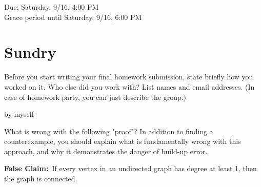 \documentclass[11pt]{article}
\begin{document}
\maketitle
\fontsize{12}{15}\selectfont

\begin{center}
    Due: Saturday, 9/16, 4:00 PM \\
    Grace period until Saturday, 9/16, 6:00 PM \\
\end{center}

\section*{Sundry}
Before you start writing your final homework submission, state briefly how you worked on it.  Who else did you work with?  List names and email addresses.  (In case of homework party, you can just describe the group.)
\begin{solution}
    by myself
\end{solution}

\vspace{15pt}


What is wrong with the following "proof"? In addition to finding a counterexample, you should explain what is fundamentally wrong with this approach, and why it demonstrates the danger of build-up error.

\textbf{False Claim:}~If every vertex in an undirected graph has degree at least 1, then the graph is connected.
\end{document}
